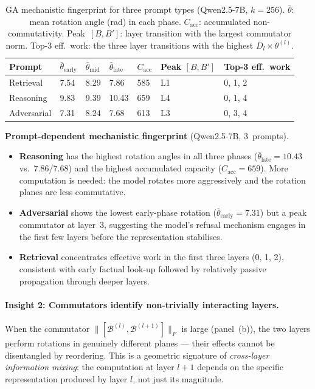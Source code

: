 \documentclass[11pt, twoside, openright]{memoir}
\newcommand{\bivec}[1]{\mathcal{B}^{(#1)}}  %
\numberwithin{equation}{chapter}
\begin{document}
\begin{table}[ht]
\centering\small
\renewcommand{\arraystretch}{1.3}
\begin{tabular}{@{}l C{1.5cm} C{1.5cm} C{1.5cm} C{1.5cm} C{1.5cm} C{2.2cm}@{}}
\toprule
{}
\textbf{Prompt} &
  $\bar\theta_{\text{early}}$ &
  $\bar\theta_{\text{mid}}$ &
  $\bar\theta_{\text{late}}$ &
  $C_{\mathrm{acc}}$ &
  Peak $[B,B']$ &
  Top-3 eff.\ work \\
\midrule
Retrieval   & 7.54 & 8.29 & 7.86 & 585 & L1  & 0, 1, 2 \\
Reasoning   & 9.83 & 9.39 & 10.43 & 659 & L4  & 0, 1, 4 \\
Adversarial & 7.31 & 8.24 & 7.68 & 613 & L3  & 0, 3, 4 \\
\bottomrule
\end{tabular}
\caption{GA mechanistic fingerprint for three prompt types
  (Qwen2.5-7B, $k = 256$).  $\bar\theta$: mean rotation angle
  (rad) in each phase.  $C_{\mathrm{acc}}$: accumulated
  non-commutativity.  Peak~$[B,B']$: layer transition with the
  largest commutator norm.  Top-3 eff.\ work: the three layer
  transitions with the highest $D_l \times \theta^{(l)}$.}
\label{tab:mech-phases}
\end{table}

\begin{finding}
\textbf{Prompt-dependent mechanistic fingerprint} (Qwen2.5-7B,
3~prompts).
\begin{itemize}[nosep]
\item \textbf{Reasoning} has the highest rotation angles in all
  three phases ($\bar\theta_{\text{late}} = 10.43$ vs.\
  $7.86$/$7.68$) and the highest accumulated capacity
  ($C_{\mathrm{acc}} = 659$).  More computation is needed: the model
  rotates more aggressively and the rotation planes are less
  commutative.
\item \textbf{Adversarial} shows the lowest early-phase rotation
  ($\bar\theta_{\text{early}} = 7.31$) but a peak commutator at
  layer~3, suggesting the model's refusal mechanism engages in the
  first few layers before the representation stabilises.
\item \textbf{Retrieval} concentrates effective work in the first
  three layers (0, 1, 2), consistent with early factual look-up
  followed by relatively passive propagation through deeper layers.
\end{itemize}
\end{finding}

\paragraph{Insight 2: Commutators identify non-trivially interacting
layers.}
When the commutator $\|[\bivec{l}, \bivec{l+1}]\|_F$ is large
(panel~(b)), the two layers perform rotations in genuinely different
planes --- their effects cannot be disentangled by reordering.
This is a geometric signature of \emph{cross-layer information
mixing}: the computation at layer $l+1$ depends on the specific
representation produced by layer $l$, not just its magnitude.
\end{document}
